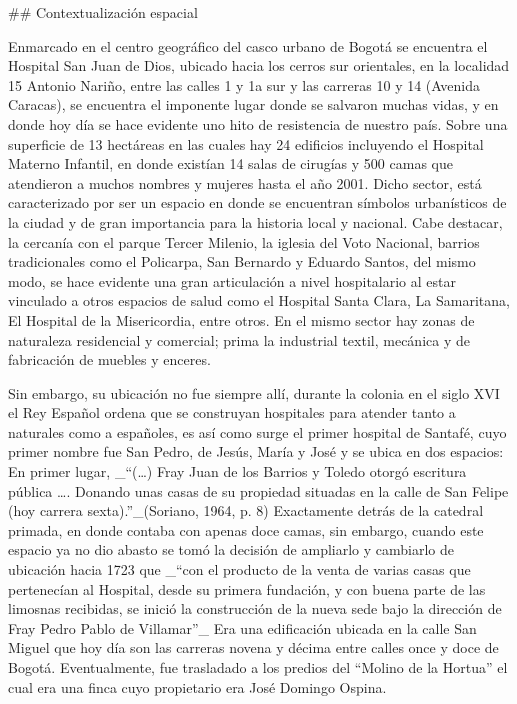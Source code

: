 
## Contextualización espacial

Enmarcado en el centro geográfico del casco urbano de Bogotá se encuentra el Hospital San Juan de Dios, ubicado hacia los cerros sur orientales, en la localidad 15 Antonio Nariño, entre las calles 1 y 1a sur y las carreras 10 y 14 (Avenida Caracas), se encuentra el imponente lugar donde se salvaron muchas vidas, y en donde hoy día se hace evidente uno hito de resistencia de nuestro país. Sobre una superficie de 13 hectáreas en las cuales hay 24 edificios incluyendo el Hospital Materno Infantil, en donde existían 14 salas de cirugías y 500 camas que atendieron a muchos nombres y mujeres hasta el año 2001. Dicho sector, está caracterizado por ser un espacio en donde se encuentran símbolos urbanísticos de la ciudad y de gran importancia para la historia local y nacional. Cabe destacar, la cercanía con el parque Tercer Milenio, la iglesia del Voto Nacional, barrios tradicionales como el Policarpa, San Bernardo y Eduardo Santos, del mismo modo, se hace evidente una gran articulación a nivel hospitalario al estar vinculado a otros espacios de salud como el Hospital Santa Clara, La Samaritana, El Hospital de la Misericordia, entre otros. En el mismo sector hay zonas de naturaleza residencial y comercial; prima la industrial textil, mecánica y de fabricación de muebles y enceres.

Sin embargo, su ubicación no fue siempre allí, durante la colonia en el siglo XVI el Rey Español ordena que se construyan hospitales para atender tanto a naturales como a españoles, es así como surge el primer hospital de Santafé, cuyo primer nombre fue San Pedro, de Jesús, María y José y se ubica en dos espacios: En primer lugar, _“(…) Fray Juan de los Barrios y Toledo otorgó escritura pública …. Donando unas casas de su propiedad situadas en la calle de San Felipe (hoy carrera sexta).”_(Soriano, 1964, p. 8) Exactamente detrás de la catedral primada, en donde contaba con apenas doce camas, sin embargo, cuando este espacio ya no dio abasto se tomó la decisión de ampliarlo y cambiarlo de ubicación hacia 1723 que _“con el producto de la venta de varias casas que pertenecían al Hospital, desde su primera fundación, y con buena parte de las limosnas recibidas, se inició la construcción de la nueva sede bajo la dirección de Fray Pedro Pablo de Villamar”_ Era una edificación ubicada en la calle San Miguel que hoy día son las carreras novena y décima entre calles once y doce de Bogotá. Eventualmente, fue trasladado a los predios del “Molino de la Hortua” el cual era una finca cuyo propietario era José Domingo Ospina.



